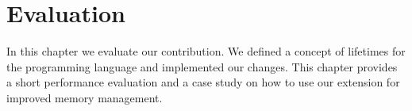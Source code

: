 \chapter{Evaluation}\label{chapter:evaluation}

In this chapter we evaluate our contribution.
We defined a concept of lifetimes for the \whiley programming language and implemented our changes.
This chapter provides a short performance evaluation and a case study on how to use our extension for improved memory management.
